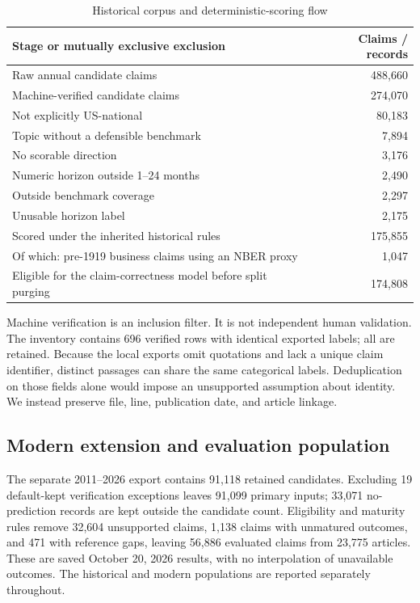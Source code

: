 \begin{table}[t]
\caption{Historical corpus and deterministic-scoring flow}\label{tab:flow}
\centering\small
\begin{tabularx}{\linewidth}{Xr}
\toprule
Stage or mutually exclusive exclusion & Claims / records\\
\midrule
Raw annual candidate claims & 488,660\\
Machine-verified candidate claims & 274,070\\
\quad Not explicitly US-national & 80,183\\
\quad Topic without a defensible benchmark & 7,894\\
\quad No scorable direction & 3,176\\
\quad Numeric horizon outside 1--24 months & 2,490\\
\quad Outside benchmark coverage & 2,297\\
\quad Unusable horizon label & 2,175\\
\midrule
Scored under the inherited historical rules & 175,855\\
\quad Of which: pre-1919 business claims using an NBER proxy & 1,047\\
Eligible for the claim-correctness model before split purging & 174,808\\
\bottomrule
\end{tabularx}
\end{table}

Machine verification is an inclusion filter. It is not independent human validation. The inventory contains 696 verified rows with identical exported labels; all are retained. Because the local exports omit quotations and lack a unique claim identifier, distinct passages can share the same categorical labels. Deduplication on those fields alone would impose an unsupported assumption about identity. We instead preserve file, line, publication date, and article linkage.

\subsection{Modern extension and evaluation population}
The separate 2011--2026 export contains 91,118 retained candidates. Excluding 19 default-kept verification exceptions leaves 91,099 primary inputs; 33,071 no-prediction records are kept outside the candidate count. Eligibility and maturity rules remove 32,604 unsupported claims, 1,138 claims with unmatured outcomes, and 471 with reference gaps, leaving 56,886 evaluated claims from 23,775 articles. These are saved October 20, 2026 results, with no interpolation of unavailable outcomes. The historical and modern populations are reported separately throughout.

